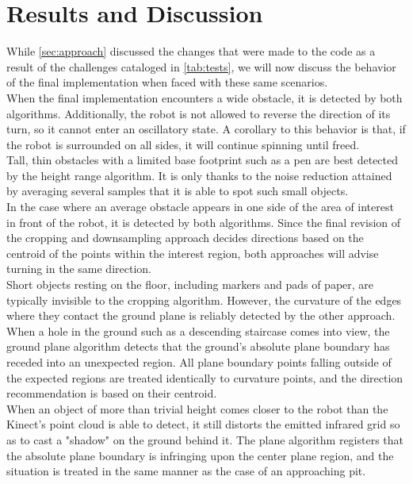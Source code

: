 \documentclass[12pt]{report}
\begin{document}
\section{Results and Discussion}
While \autoref{sec:approach} discussed the changes that were made to the code as a result of the challenges cataloged in \autoref{tab:tests}, we will now discuss the behavior of the final implementation when faced with these same scenarios. \\
When the final implementation encounters a wide obstacle, it is detected by both algorithms.  Additionally, the robot is not allowed to reverse the direction of its turn, so it cannot enter an oscillatory state.  A corollary to this behavior is that, if the robot is surrounded on all sides, it will continue spinning until freed. \\
Tall, thin obstacles with a limited base footprint such as a pen are best detected by the height range algorithm.  It is only thanks to the noise reduction attained by averaging several samples that it is able to spot such small objects. \\
In the case where an average obstacle appears in one side of the area of interest in front of the robot, it is detected by both algorithms.  Since the final revision of the cropping and downsampling approach decides directions based on the centroid of the points within the interest region, both approaches will advise turning in the same direction. \\
Short objects resting on the floor, including markers and pads of paper, are typically invisible to the cropping algorithm.  However, the curvature of the edges where they contact the ground plane is reliably detected by the other approach. \\
When a hole in the ground such as a descending staircase comes into view, the ground plane algorithm detects that the ground's absolute plane boundary has receded into an unexpected region.  All plane boundary points falling outside of the expected regions are treated identically to curvature points, and the direction recommendation is based on their centroid. \\
When an object of more than trivial height comes closer to the robot than the Kinect's point cloud is able to detect, it still distorts the emitted infrared grid so as to cast a "shadow" on the ground behind it.  The plane algorithm registers that the absolute plane boundary is infringing upon the center plane region, and the situation is treated in the same manner as the case of an approaching pit. \\
\end{document}

